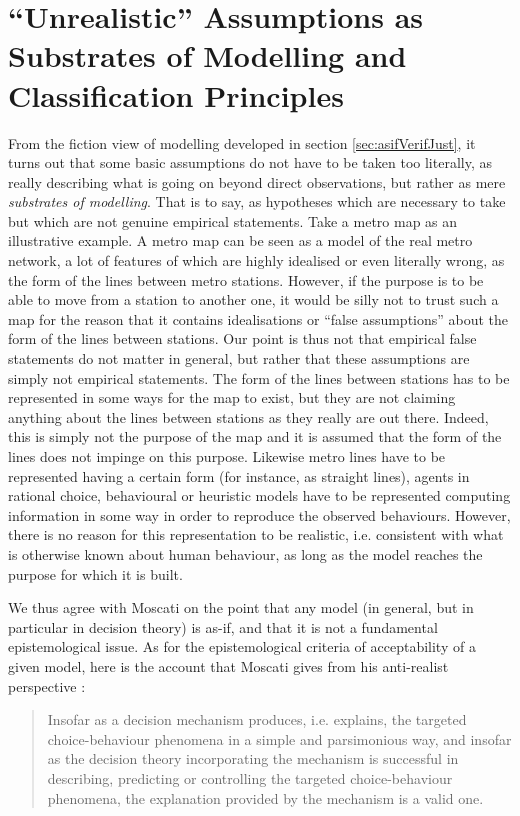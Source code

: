 \documentclass[a4paper,11pt]{article}
\theoremstyle{definition}
\begin{document}
\section{``Unrealistic'' Assumptions as Substrates of Modelling and Classification Principles}
\label{sec:epistemo_criterion}

From the fiction view of modelling developed in section \ref{sec:asifVerifJust}, it turns out that some basic assumptions do not have to be taken too literally, as really describing what is going on beyond direct observations, but rather as mere \textit{substrates of modelling}. That is to say, as hypotheses which are necessary to take but which are not genuine empirical statements. Take a metro map as an illustrative example. A metro map can be seen as a model of the real metro network, a lot of features of which are highly idealised or even literally wrong, as the form of the lines between metro stations. However, if the purpose is to be able to move from a station to another one, it would be silly not to trust such a map for the reason that it contains idealisations or ``false assumptions'' about the form of the lines between stations. Our point is thus not that empirical false statements do not matter in general, but rather that these assumptions are simply not empirical statements. The form of the lines between stations has to be represented in some ways for the map to exist, but they are not claiming anything about the lines between stations as they really are out there. Indeed, this is simply not the purpose of the map and it is assumed that the form of the lines does not impinge on this purpose. Likewise metro lines have to be represented having a certain form (for instance, as straight lines), agents in rational choice, behavioural or heuristic models have to be represented computing information in some way in order to reproduce the observed behaviours. However, there is no reason for this representation to be realistic, i.e. consistent with what is otherwise known about human behaviour, as long as the model reaches the purpose for which it is built. 

We thus agree with Moscati on the point that any model (in general, but in particular in decision theory) is as-if, and that it is not a fundamental epistemological issue. As for the epistemological criteria of acceptability of a given model, here is the account that Moscati gives from his anti-realist perspective \citep[p.~22]{Moscati2023}: 

\begin{quote}
Insofar as a decision mechanism produces, i.e. explains, the targeted choice-behaviour phenomena in a simple and parsimonious way, and insofar as the decision theory incorporating the mechanism is successful \textelp{} in describing, predicting or controlling the targeted choice-behaviour phenomena, the explanation provided by the mechanism is a valid one.
\end{quote}
\end{document}
